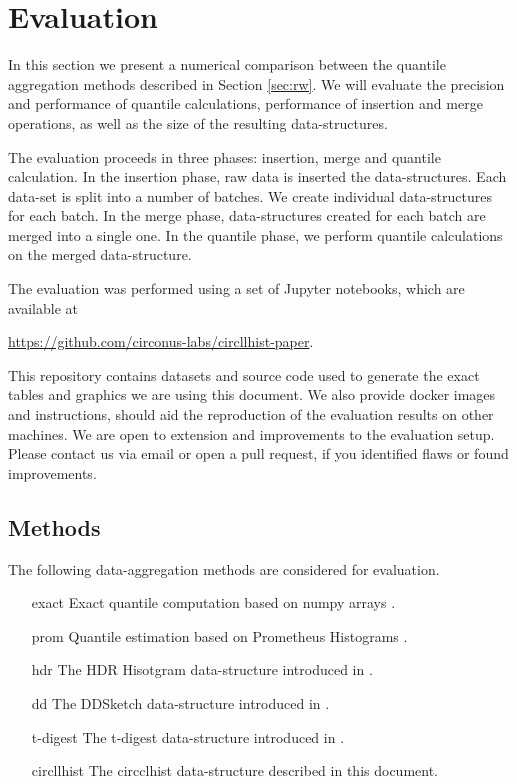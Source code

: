 \documentclass{article}
\theoremstyle{plain}
\theoremstyle{remark}
\begin{document}
\section{Evaluation}
\label{sec:eval}

In this section we present a numerical comparison between the quantile aggregation methods described
in Section \ref{sec:rw}. We will evaluate the precision and performance of quantile calculations,
performance of insertion and merge operations, as well as the size of the resulting data-structures.

The evaluation proceeds in three phases: insertion, merge and quantile calculation. In the insertion
phase, raw data is inserted the data-structures. Each data-set is split into a number of batches. We
create individual data-structures for each batch. In the merge phase, data-structures created for
each batch are merged into a single one.  In the quantile phase, we perform quantile calculations on
the merged data-structure.

The evaluation was performed using a set of Jupyter notebooks, which are available at
\begin{center}
  \url{https://github.com/circonus-labs/circllhist-paper}.
\end{center}
This repository contains datasets and source code used to generate the exact tables and graphics we
are using this document.  We also provide docker images and instructions, should aid the
reproduction of the evaluation results on other machines.  We are open to extension and improvements
to the evaluation setup. Please contact us via email or open a pull request, if you identified flaws
or found improvements.

\subsection{Methods}

The following data-aggregation methods are considered for evaluation.

\begin{itemize}
\item[exact] Exact quantile computation based on numpy arrays \cite{numpy}.
\item[prom] Quantile estimation based on Prometheus Histograms \cite{prom}.
\item[hdr] The HDR Hisotgram data-structure introduced in \cite{hdr}.
\item[dd] The DDSketch data-structure introduced in \cite{dd}.
\item[t-digest] The t-digest data-structure introduced in \cite{tdigest}.
\item[circllhist] The circclhist data-structure described in this document.
\end{itemize}
\end{document}
